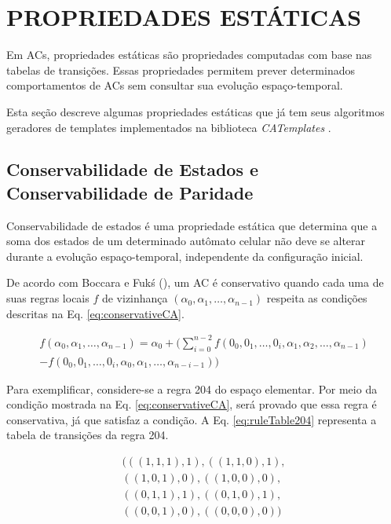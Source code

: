 \section{PROPRIEDADES ESTÁTICAS}
\label{sec:propriedadeEstaticasDef}
Em ACs, propriedades estáticas são propriedades computadas com base nas tabelas de transições. Essas propriedades permitem prever determinados comportamentos de ACs sem consultar sua evolução espaço-temporal. 

Esta seção descreve algumas propriedades estáticas que já tem seus algoritmos geradores de templates implementados na biblioteca \textit{CATemplates} \cite{CATemplates}.

\subsection{Conservabilidade de Estados e Conservabilidade de Paridade}
Conservabilidade de estados é uma propriedade estática que determina que a soma dos estados de um determinado autômato celular não deve se alterar durante a evolução espaço-temporal, independente da configuração inicial.

De acordo com Boccara e Fukś (\citeyear{boccara2002}), um AC é conservativo quando cada uma de suas regras locais $f$ de vizinhança $(\alpha_0,\alpha_1, \dots, \alpha_{n-1})$ respeita as condições descritas na Eq. \eqref{eq:conservativeCA}.

\begin{equation}
\begin{split}
f(\alpha_0,\alpha_1, \dots,\alpha_{n-1}) = \alpha_0 + (\sum_{i=0}^{n-2}f(0_0,0_1, \dots,0_i,\alpha_1,\alpha_2, \dots,\alpha_{n-1}) \\- f(0_0,0_1, \dots,0_i,\alpha_0,\alpha_1, \dots,\alpha_{n-i-1}))
\label{eq:conservativeCA}
\end{split}
\end{equation}

Para exemplificar, considere-se a regra 204 do espaço elementar. Por meio da condição mostrada na Eq. \eqref{eq:conservativeCA}, será provado que essa regra é conservativa, já que satisfaz a condição. A Eq. \eqref{eq:ruleTable204} representa a tabela de transições da regra 204.

\begin{equation}
\begin{split}
(((1,1,1),1),((1,1,0),1),\\((1,0,1),0),((1,0,0),0),\\((0,1,1),1),((0,1,0),1),\\((0,0,1),0),((0,0,0),0))
\label{eq:ruleTable204}
\end{split}
\end{equation}

